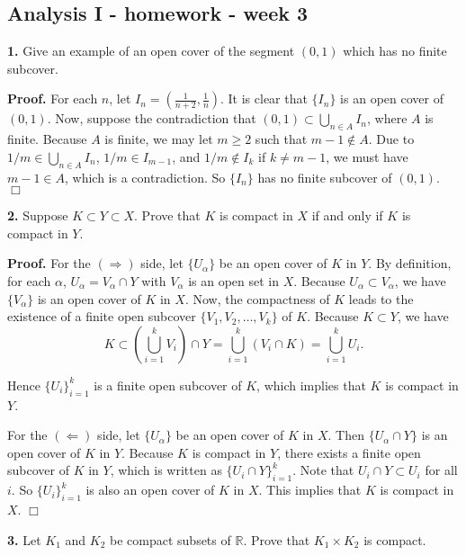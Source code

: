 \documentclass{article}
\begin{document}
    
    
    
    
    

    
    \subsection*{Analysis I - homework - week
3}\label{analysis-i---homework---week-3}

    \textbf{1.} Give an example of an open cover of the segment $(0,1)$
which has no finite subcover.

\textbf{Proof.} For each $n$, let $I_n = (\frac{1}{n+2},\frac{1}{n})$.
It is clear that $\{I_n\}$ is an open cover of $(0,1)$. Now, suppose the
contradiction that $(0,1)\subset \bigcup_{n\in A} I_n$, where $A$ is
finite. Because $A$ is finite, we may let $m \ge 2$ such that
$m-1 \notin A$. Due to $1/m \in \bigcup_{n\in A} I_n$,
$1/m \in I_{m-1}$, and $1/m \notin I_k$ if $k \ne m-1$, we must have
$m-1 \in A$, which is a contradiction. So $\{I_n\}$ has no finite
subcover of $(0,1)$. $\Box$

    \textbf{2.} Suppose $K\subset Y\subset X$. Prove that $K$ is compact in
$X$ if and only if $K$ is compact in $Y$.

\textbf{Proof.} For the $(\Rightarrow)$ side, let $\{U_{\alpha}\}$ be an
open cover of $K$ in $Y$. By definition, for each $\alpha$,
$U_{\alpha} = V_{\alpha} \cap Y$ with $V_{\alpha}$ is an open set in
$X$. Because $U_{\alpha} \subset V_{\alpha}$, we have $\{V_{\alpha}\}$
is an open cover of $K$ in $X$. Now, the compactness of $K$ leads to the
existence of a finite open subcover $\{V_{1},V_{2},\ldots,V_{k}\}$ of
$K$. Because $K \subset Y$, we have
\[ K \subset \left(\bigcup_{i=1}^{k} V_{i}\right)\cap Y = \bigcup_{i=1}^k (V_{i} \cap K) = \bigcup_{i=1}^k U_{i}.\]

Hence $\{U_{i}\}_{i=1}^k$ is a finite open subcover of $K$, which
implies that $K$ is compact in $Y$.

For the $(\Leftarrow)$ side, let $\{U_{\alpha}\}$ be an open cover of
$K$ in $X$. Then $\{U_{\alpha} \cap Y\}$ is an open cover of $K$ in $Y$.
Because $K$ is compact in $Y$, there exists a finite open subcover of
$K$ in $Y$, which is written as $\{U_{i}\cap Y\}_{i=1}^k$. Note that
$U_{i}\cap Y \subset U_{i}$ for all $i$. So $\{U_{i}\}_{i=1}^k$ is also
an open cover of $K$ in $X$. This implies that $K$ is compact in $X$.
$\Box$

    \textbf{3.} Let $K_1$ and $K_2$ be compact subsets of $\mathbb{R}$.
Prove that $K_1 \times K_2$ is compact.
\end{document}
